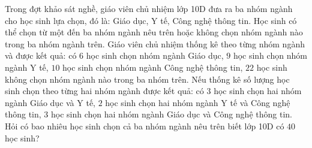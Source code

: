 \begin{ex}%
	Trong đợt khảo sát nghề, giáo viên chủ nhiệm lớp 10D đưa ra ba nhóm ngành cho học sinh lựa chọn, đó là: Giáo dục, Y tế, Công nghệ thông tin. Học sinh có thể chọn từ một đến ba nhóm ngành nêu trên hoặc không chọn nhóm ngành nào trong ba nhóm ngành trên. Giáo viên chủ nhiệm thống kê theo từng nhóm ngành và được kết quả: có $6$ học sinh chọn nhóm ngành Giáo dục, $9$ học sinh chọn nhóm ngành Y tế, $10$ học sinh chọn nhóm ngành Công nghệ thông tin, $22$ học sinh không chọn nhóm ngành nào trong ba nhóm trên. Nếu thống kê số lượng học sinh chọn theo từng hai nhóm ngành được kết quả: có $3$ học sinh chọn hai nhóm ngành Giáo dục và Y tế, $2$ học sinh chọn hai nhóm ngành Y tế và Công nghệ thông tin, $3$ học sinh chọn hai nhóm ngành Giáo dục và Công nghệ thông tin. Hỏi có bao nhiêu học sinh chọn cả ba nhóm ngành nêu trên biết lớp 10D có $40$ học sinh?
\end{ex}
